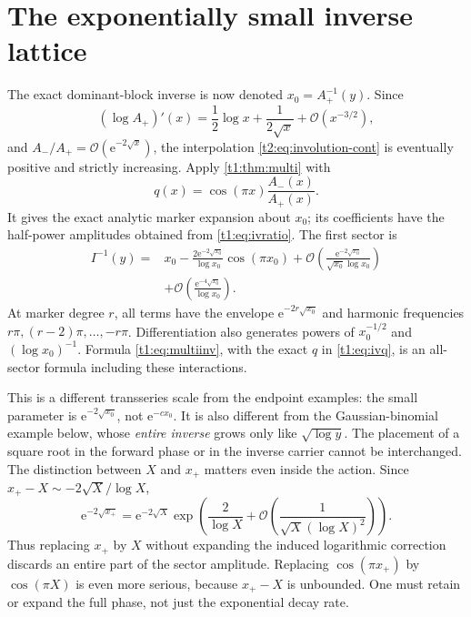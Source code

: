 \documentclass[11pt,openany]{book}
\numberwithin{equation}{chapter}
\theoremstyle{plain}
\theoremstyle{definition}
\theoremstyle{remark}
\newcommand{\ee}{\mathrm e}
\newcommand{\OO}{\mathcal O}\newcommand{\bigO}{\mathcal O}
\begin{document}
\section{The exponentially small inverse lattice}
The exact dominant-block inverse is now denoted $x_0=A_+^{-1}(y)$. Since
\[
 (\log A_+)'(x)=\frac12\log x+\frac1{2\sqrt x}+\OO(x^{-3/2}),
\]
and $A_-/A_+=\OO(\ee^{-2\sqrt x})$, the interpolation \eqref{t2:eq:involution-cont} is eventually positive and strictly increasing. Apply \cref{t1:thm:multi} with
\begin{equation}
 q(x)=\cos(\pi x)\frac{A_-(x)}{A_+(x)}.
 \label{t1:eq:ivq}
\end{equation}
It gives the exact analytic marker expansion about $x_0$; its coefficients have the half-power amplitudes obtained from \eqref{t1:eq:ivratio}. The first sector is
\begin{align}
 I^{-1}(y)={}&x_0-
 \frac{2\ee^{-2\sqrt{x_0}}}{\log x_0}\cos(\pi x_0)
 +\OO\!\left(\frac{\ee^{-2\sqrt{x_0}}}{\sqrt{x_0}\log x_0}\right)\nonumber\\
 &+\OO\!\left(\frac{\ee^{-4\sqrt{x_0}}}{\log x_0}\right).
 \label{t1:eq:ivexpinverse}
\end{align}
At marker degree $r$, all terms have the envelope $\ee^{-2r\sqrt{x_0}}$ and harmonic frequencies $r\pi,(r-2)\pi,\ldots,-r\pi$. Differentiation also generates powers of $x_0^{-1/2}$ and $(\log x_0)^{-1}$. Formula \eqref{t1:eq:multiinv}, with the exact $q$ in \eqref{t1:eq:ivq}, is an all-sector formula including these interactions.

This is a different transseries scale from the endpoint examples: the small parameter is $\ee^{-2\sqrt{x_0}}$, not $\ee^{-c x_0}$. It is also different from the Gaussian-binomial example below, whose \emph{entire inverse} grows only like $\sqrt{\log y}$. The placement of a square root in the forward phase or in the inverse carrier cannot be interchanged.
The distinction between $X$ and $x_+$ matters even inside the action. Since
$x_+-X\sim-2\sqrt X/\log X$,
\[
 \ee^{-2\sqrt{x_+}}
 =\ee^{-2\sqrt X}\exp\left(\frac2{\log X}
             +\bigO\!\left(\frac1{\sqrt X(\log X)^2}\right)\right).
\]
Thus replacing $x_+$ by $X$ without expanding the induced logarithmic correction discards an entire part of the sector amplitude. Replacing $\cos(\pi x_+)$ by $\cos(\pi X)$ is even more serious, because $x_+-X$ is unbounded. One must retain or expand the full phase, not just the exponential decay rate.
\end{document}
